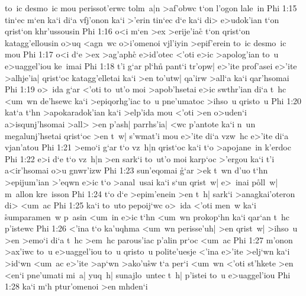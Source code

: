 to~ic
desmo~ic
mou
perissot'erwc
tolm~a|n
>af'obwc
t`on
l'ogon
lale~in\bibvsend
\vs Phi 1:15
tin`ec
m`en
ka`i
di`a
vfj'onon
ka`i
>'erin
tin`ec
d`e
ka`i
di>
e>udok'ian
t`on
qrist`on
khr'ussousin\bibvsend
\vs Phi 1:16
o<i
m`en
>ex
>erije'iac\r{}
t`on
qrist`on
katagg'ellousin
o>uq
<agn~wc
o>i'omenoi
vjl'iyin
>epif'erein
to~ic
desmo~ic
mou\bibvsend
\vs Phi 1:17
o<i
d`e
>ex
>ag'aphc\r{}
e>id'otec
<'oti
e>ic
>apolog'ian
to~u
e>uaggel'iou
ke~imai\bibvsend
\vs Phi 1:18
t'i
g`ar
pl`h\r{n}
pant`i
tr'opw|
e>'ite
prof'asei
e>'ite
>alhje'ia|
qrist`oc
katagg'elletai
ka`i
>en
to'utw|
qa'irw
>all`a
ka`i
qar'hsomai\bibvsend
\vs Phi 1:19
o>~ida
g`ar
<'oti
to~ut'o
moi
>apob'hsetai
e>ic
swthr'ian
di`a
t~hc
<um~wn
de'hsewc
ka`i
>epiqorhg'iac
to~u
pne'umatoc
>ihso~u
qristo~u\bibvsend
\vs Phi 1:20
kat`a
t`hn
>apokaradok'ian
ka`i
>elp'ida
mou
<'oti
>en
o>uden`i
a>isqunj'hsomai
>all>
>en
p'ash|
parrhs'ia|
<wc
p'antote
ka`i
n~un
megalunj'hsetai
qrist`oc
>en
t~w|
s'wmat'i
mou
e>'ite
di`a
vzw~hc
e>'ite
di`a
vjan'atou\bibvsend
\vs Phi 1:21
>emo`i
g`ar
t`o
vz~h|n
qrist`oc
ka`i
t`o
>apojane~in
k'erdoc\bibvsend
\vs Phi 1:22
e>i
d`e
t`o
vz~h|n
>en
sark`i
to~ut'o
moi
karp`oc
>'ergou
ka`i
t'i
a<ir'hsomai
o>u
gnwr'izw\bibvsend
\vs Phi 1:23
sun'eqomai
\r{g}`ar
>ek
t~wn
d'uo
t`hn
>epijum'ian
>'eqwn
e>ic
t`o
>anal~usai
ka`i
s`un
qrist~w|
e>~inai
p\r{o}ll~w|
m~allon
kre~isson\bibvsend
\vs Phi 1:24
t`o
d`e
>epim'enein
>en
t~h|
sark`i
>anagkai'oteron
di>
<um~ac\bibvsend
\vs Phi 1:25
ka`i
to~uto
pepoij`wc
o>~ida
<'oti
men~w
ka`i
\r{s}umparamen~w
p~asin
<um~in
e>ic
t`hn
<um~wn
prokop`hn
ka`i
qar`an
t~hc
p'istewc\bibvsend
\vs Phi 1:26
<'ina
t`o
ka'uqhma
<um~wn
perisse'uh|
>en
qrist~w|
>ihso~u
>en
>emo`i
di`a
t~hc
>em~hc
parous'iac
p'alin
pr`oc
<um~ac\bibvsend
\vs Phi 1:27
m'onon
>ax'iwc
to~u
e>uaggel'iou
to~u
qristo~u
polite'uesje
<'ina
e>'ite
>elj`wn
ka`i
>id`wn
<um~ac
e>'ite
>ap`wn
>ako'u\r{s}w
t`a
per`i
<um~wn
<'oti
st'hkete
>en
<en`i
pne'umati
mi~a|
yuq~h|
sunajlo~untec
t~h|
p'istei
to~u
e>uaggel'iou\bibvsend
\vs Phi 1:28
ka`i
m`h
ptur'omenoi
>en
mhden`i
